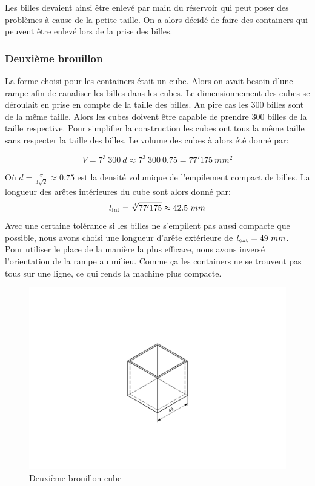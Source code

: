 Les billes devaient ainsi être enlevé par main du réservoir qui peut poser des problèmes à cause de la petite taille. On a alors décidé de faire des containers qui peuvent être enlevé lors de la prise des billes. 

\subsubsection{Deuxième brouillon}
La forme choisi pour les containers était un cube. Alors on avait besoin d'une rampe afin de canaliser les billes dans les cubes.  Le dimensionnement des cubes se déroulait en prise en compte de la taille des billes. Au pire cas les 300 billes sont de la même taille. Alors les cubes doivent être capable de prendre 300 billes de la taille respective. Pour simplifier la construction les cubes ont tous la même taille sans respecter la taille des billes. Le volume des cubes à alors été donné par:

\[V = 7^3\ 300\ d \approx 7^3\ 300\ 0.75 = 77'175\ mm^2\]

Où \(d = \frac{ \pi }{3\sqrt{2}} \approx 0.75\) est la densité volumique de l'empilement compact de billes. La longueur des arêtes intérieures du cube sont alors donné par:
\[l\textsubscript{int}=\sqrt[3]{77'175} \approx 42.5\ mm\]
Avec une certaine tolérance si les billes ne s'empilent pas aussi compacte que possible, nous avons choisi une longueur d'arête extérieure de \(l\textsubscript{ext}=49\ mm\).\\
Pour utiliser le place de la manière la plus efficace, nous avons inversé l'orientation de la rampe au milieu. Comme ça les containers ne se trouvent pas tous sur une ligne, ce qui rends la machine plus compacte. 

\begin{figure}
    \centering
    \includegraphics[width=\textwidth]{Graphics/DEUXIEME_BROUILLON_1.pdf}
    \caption{Deuxième brouillon cube}
\end{figure}

